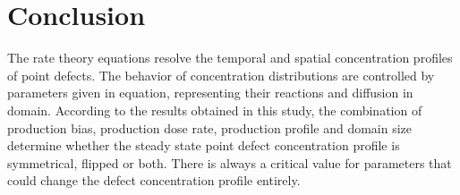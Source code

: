 \documentclass[a4paper]{article}
\begin{document}
%
%
%
%

\newpage
\section{Conclusion} \hspace{10pt}

The rate theory equations resolve the temporal and spatial concentration profiles of point defects. The behavior of concentration distributions are controlled by parameters given in equation, representing their reactions and diffusion in domain. According to the results obtained in this study, the combination of production bias, production dose rate, production profile and domain size determine whether the steady state point defect concentration profile is symmetrical, flipped or both. There is always a critical value for parameters that could change the defect concentration profile entirely.



\end{document}

